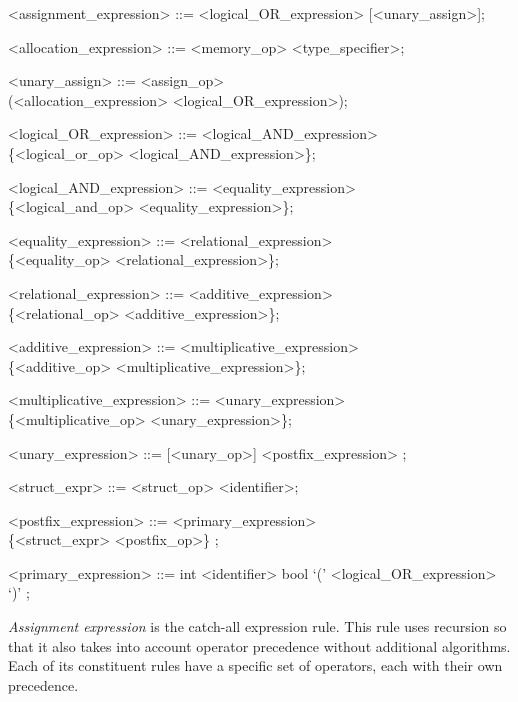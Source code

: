 \documentclass[a4paper,11pt]{article}
\begin{document}
\begin{grammar}
        <assignment_expression> ::= <logical_OR_expression> [<unary_assign>];

        <allocation_expression> ::= <memory_op> <type_specifier>;

        <unary_assign> ::= <assign_op>\\
        (<allocation_expression> \alt <logical_OR_expression>);

        <logical_OR_expression> ::= <logical_AND_expression>\\
        \{<logical_or_op> <logical_AND_expression>\};

        <logical_AND_expression> ::= <equality_expression>\\
        \{<logical_and_op> <equality_expression>\};

        <equality_expression> ::= <relational_expression>\\
        \{<equality_op> <relational_expression>\};

        <relational_expression> ::= <additive_expression>\\
        \{<relational_op> <additive_expression>\};

        <additive_expression> ::= <multiplicative_expression>\\
        \{<additive_op> <multiplicative_expression>\};

        <multiplicative_expression> ::= <unary_expression>\\
        \{<multiplicative_op> <unary_expression>\};

        <unary_expression> ::=
                [<unary_op>]
               <postfix_expression>
            ;

        <struct_expr> ::= <struct_op> <identifier>;

        <postfix_expression> ::=
                <primary_expression>\\
               \{<struct_expr> \alt <postfix_op>\}
            ;

        <primary_expression> ::=
                int
            \alt   <identifier>
            \alt   bool
            \alt   `(' <logical_OR_expression> `)'
            ;
\end{grammar}
\textit{Assignment expression} is the catch-all expression rule.
This rule uses recursion so that it also takes into account operator precedence without additional algorithms.
Each of its constituent rules have a specific set of operators, each with their own precedence.
\end{document}

